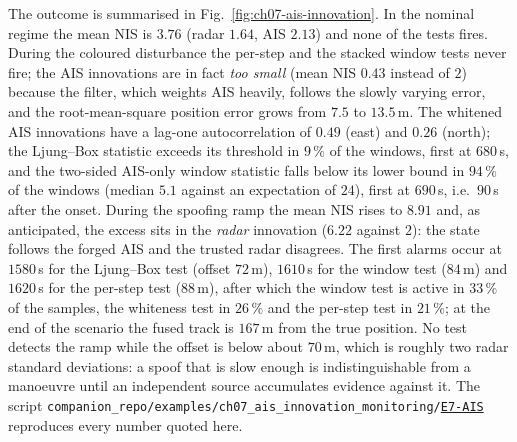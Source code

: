 \documentclass[graybox,envcountchap]{style/SNmono}
\newcommand{\repopath}[1]{\texttt{#1}}
\providecommand{\DIFadd}[1]{{\protect\color{blue} #1}} %
\providecommand{\DIFdel}[1]{{\protect\color{red} #1}} %
\DeclareRobustCommand{\RtwoDel}[1]{{\color{red}%
  \renewcommand{\DIFadd}[1]{##1}\renewcommand{\DIFdel}[1]{##1}%
  #1}}
\DeclareRobustCommand{\RtwoAdd}[1]{{\color{blue}#1}}
\DeclareRobustCommand{\codeentry}[1]{\hyperref[code:#1]{\texttt{#1}}}
\begin{document}
\begin{example}
The outcome is summarised in Fig.~\ref{fig:ch07-ais-innovation}. In the nominal regime the mean NIS is $3.76$ (radar $1.64$, AIS $2.13$) and none of the tests fires. During the coloured disturbance the per-step and the stacked window tests never fire; the AIS innovations are in fact \emph{too small} (mean NIS $0.43$ instead of $2$) because the filter, which weights AIS heavily, follows the slowly varying error, and the root-mean-square position error grows from $7.5$ to $13.5$\,m. The whitened AIS innovations have a lag-one autocorrelation of $0.49$ (east) and $0.26$ (north); the Ljung--Box statistic exceeds its threshold in $9\,\%$ of the windows, first at $680$\,s, and the two-sided AIS-only window statistic falls below its lower bound in $94\,\%$ of the windows (median $5.1$ against an expectation of $24$), first at $690$\,s, i.e.\ $90$\,s after the onset. During the spoofing ramp the mean NIS rises to $8.91$ and, as anticipated, the excess sits in the \emph{radar} innovation ($6.22$ against $2$): the state follows the forged AIS and the trusted radar disagrees. The first alarms occur at $1580$\,s for the Ljung--Box test (offset $72$\,m), $1610$\,s for the window test ($84$\,m) and $1620$\,s for the per-step test ($88$\,m), after which the window test is active in $33\,\%$ of the samples, the whiteness test in $26\,\%$ and the per-step test in $21\,\%$; at the end of the scenario the fused track is $167$\,m from the true position. No test detects the ramp while the offset is below about $70$\,m, which is roughly two radar standard deviations: a spoof that is slow enough is indistinguishable from a manoeuvre until an independent source accumulates evidence against it. The script \RtwoDel{\repopath{companion\_\allowbreak repo/\allowbreak examples/\allowbreak ch07\_\allowbreak ais\_\allowbreak innovation\_\allowbreak monitoring/\allowbreak }}\RtwoAdd{\codeentry{E7-AIS}} reproduces every number quoted here.
\end{example}
\end{document}
